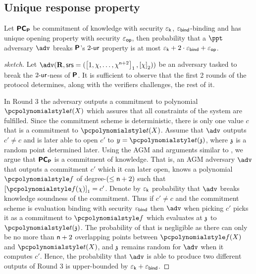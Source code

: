 \documentclass[runningheads,10pt]{llncs}
\begin{document}
\subsection{Unique response property}
\begin{lemma}
	\label{lem:plonkprot_ur}
  Let $\bm{\mathsf{PC}}_{\bm{\mathsf{P}}}$ be commitment of knowledge with security $\varepsilon_{\mathsf{k}}$,
  $\varepsilon_{\mathsf{bind}}$-binding and has unique opening property with security $\varepsilon_{\mathsf{op}}$,
  then probability that a $\ppt$ adversary $\adv$ breaks $\bm{\mathsf{P}}$'s ${2\text{-}\mathsf{ur}}$
  property is at most $\varepsilon_{\mathsf{k}} + 2\cdot\varepsilon_{\mathsf{bind}} +
  \varepsilon_{\mathsf{op}}$.%
\end{lemma}
\begin{proof}[sketch]
  Let
  $\adv(\REL,\srs = (\gone{1, \chi, \ldots, \chi^{\noofc + 2}}, \gtwo{\chi}))$
  be an adversary tasked to break the ${2\text{-}\mathsf{ur}}$-ness of $\bm{\mathsf{P}}$. It is
  sufficient to observe that the first 2 rounds of the protocol determines,
  along with the verifiers challenges, the rest of it.

  In Round 3 the adversary outputs a commitment to polynomial $\pt(X)$ which
  assures that all constraints of the system are fulfilled. Since the commitment
  scheme is deterministic, there is only one value $c$ that is a commitment to
  $\pt(X)$. Assume that $\adv$ outputs $c' \neq c$ and is later able to open
  $c'$ to $y = \pt(\chz)$, where $\mathfrak{z}$ is a random point determined later.
  Using the AGM and arguments similar to \cite{CCS:MBKM19}, we argue that
  $\bm{\mathsf{PC}}_{\bm{\mathsf{P}}}$ is a commitment of knowledge. That is, an AGM adversary $\adv$ that
  outputs a commitment $c'$ which it can later open, knows a polynomial $\p{f}$
  of degree-$(\leq \mathsf{n} + 2)$ such that $\gone{\p{f}(\chi)} = c'$. Denote by
  $\varepsilon_{\mathsf{k}}$ probability that $\adv$ breaks knowledge soundness of the commitment. Thus if
  $c' \neq c$ and the commitment scheme is evaluation binding with security
  $\varepsilon_{\mathsf{bind}}$ then $\adv$ when
  picking $c'$ picks it as a commitment to $\p{f}$ which evaluates at $\mathfrak{z}$ to
  $\pt(\chz)$. The probability of that is negligible as there can only be no
  more than $\mathsf{n} + 2$ overlapping points between $\p{f}(X)$ and $\p{t}(X)$,
  and $\mathfrak{z}$ remains random for $\adv$ when it computes $c'$. Hence, the
  probability that $\adv$ is able to produce two different outputs of Round 3 is
  upper-bounded by $\varepsilon_{\mathsf{k}} + \varepsilon_{\mathsf{bind}}$.


\end{proof}
\end{document}
